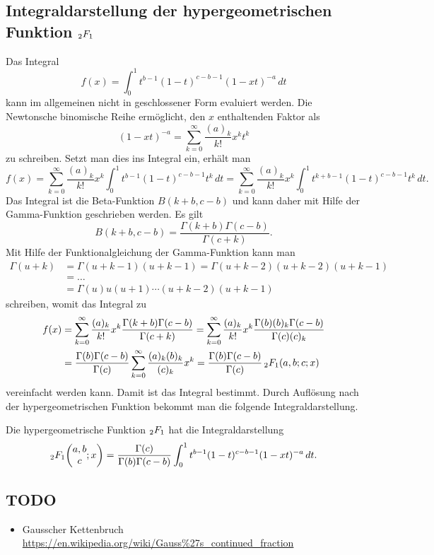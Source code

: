 \subsection{Integraldarstellung der hypergeometrischen Funktion
$\mathstrut_2F_1$}
Das Integral
\[
f(x)
=
\int_0^1 t^{b-1} (1-t)^{c-b-1} (1-xt)^{-a}\,dt
\]
kann im allgemeinen nicht in geschlossener Form evaluiert werden.
Die Newtonsche binomische Reihe ermöglicht, den $x$ enthaltenden
Faktor als
\[
(1-xt)^{-a}
=
\sum_{k=0}^\infty
\frac{(a)_k}{k!} x^k t^k
\]
zu schreiben.
Setzt man dies ins Integral ein, erhält man
\[
f(x)
=
\sum_{k=0}^\infty \frac{(a)_k}{k!} x^k
\int_0^1 t^{b-1} (1-t)^{c-b-1} t^k\,dt
=
\sum_{k=0}^\infty \frac{(a)_k}{k!} x^k
\int_0^1 t^{k+b-1} (1-t)^{c-b-1} t^k\,dt.
\]
Das Integral ist die Beta-Funktion $B(k+b,c-b)$ und kann daher mit Hilfe
der Gamma-Funktion geschrieben werden.
Es gilt
\[
B(k+b,c-b)
=
\frac{\Gamma(k+b)\Gamma(c-b)}{\Gamma(c+k)}.
\]
Mit Hilfe der Funktionalgleichung der Gamma-Funktion kann man
\begin{align*}
\Gamma(u+k)
&=
\Gamma(u+k-1) (u+k-1)
=
\Gamma(u+k-2) (u+k-2)(u+k-1)
\\
&=
\ldots
\\
&=
\Gamma(u) u(u+1)\cdots(u+k-2)(u+k-1)
\end{align*}
schreiben, womit das Integral zu
\begin{align*}
f(x)
&=
\sum_{k=0}^\infty \frac{(a)_k}{k!} x^k
\frac{\Gamma(k+b)\Gamma(c-b)}{\Gamma(c+k)}
=
\sum_{k=0}^\infty \frac{(a)_k}{k!} x^k
\frac{\Gamma(b)(b)_k\Gamma(c-b)}{\Gamma(c)(c)_k}
\\
&=
\frac{\Gamma(b)\Gamma(c-b)}{\Gamma(c)}
\sum_{k=0}^\infty\frac{(a)_k(b)_k}{(c)_k} x^k
=
\frac{\Gamma(b)\Gamma(c-b)}{\Gamma(c)}\,\mathstrut_2F_1(a,b;c;x)
\end{align*}
vereinfacht werden kann.
Damit ist das Integral bestimmt. 
Durch Auflösung nach der hypergeometrischen Funktion bekommt man
die folgende Integraldarstellung.

\begin{satz}
Die hypergeometrische Funktion $\mathstrut_2F_1$ hat die
Integraldarstellung
\[
\mathstrut_2F_1\biggl(
\begin{matrix}a,b\\c\end{matrix};x
\biggr)
=
\frac{\Gamma(c)}{\Gamma(b)\Gamma(c-b)}
\int_0^1 t^{b-1}(1-t)^{c-b-1}(1-xt)^{-a}\,dt.
\]
\end{satz}


\subsection{TODO}
\begin{itemize}
\item Gausscher Kettenbruch \url{https://en.wikipedia.org/wiki/Gauss\%27s_continued_fraction}
\end{itemize}
